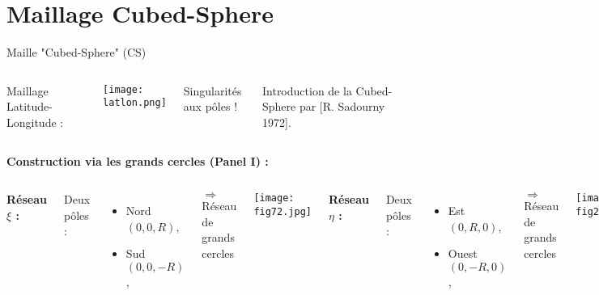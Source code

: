 \documentclass[11pt]{beamer}
\begin{document}
\begin{frame}
\tableofcontents
\end{frame}

\section{Maillage Cubed-Sphere}
\begin{frame}{Maille "Cubed-Sphere" (CS)}

\begin{columns}
Maillage Latitude-Longitude :

\begin{center}
\texttt{[image: latlon.png]}
\end{center}


\begin{alertblock}{}
Singularités aux pôles !
\end{alertblock}

\pause
Introduction de la Cubed-Sphere par [R. Sadourny 1972].
\end{columns}

\end{frame}

\begin{frame}

\textbf{Construction via les grands cercles (Panel I) :}

\begin{columns}

\vspace{0.8cm}
\textbf{Réseau $\xi$ :}

Deux pôles :
\begin{itemize}
\item Nord $(0,0,R)$,
\item Sud $(0,0,-R)$,
\end{itemize}

$\Rightarrow$ Réseau de grands cercles

\texttt{[image: fig72.jpg]}

\pause
{}

\textbf{Réseau $\eta$ :}

Deux pôles :
\begin{itemize}
\item Est $(0,R,0)$,
\item Ouest $(0,-R,0)$,
\end{itemize}

$\Rightarrow$ Réseau de grands cercles

\texttt{[image: fig22.jpg]}

\end{columns}
\end{frame}
\end{document}

